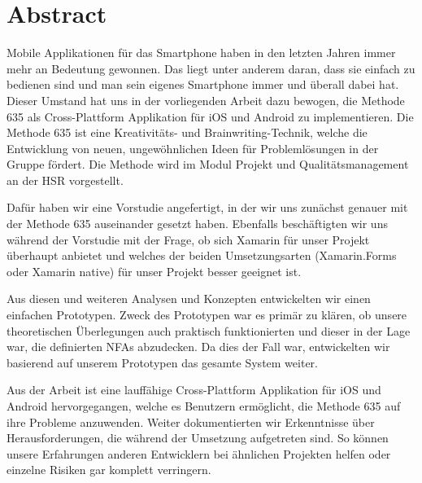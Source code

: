 \section*{Abstract}
Mobile Applikationen für das Smartphone haben in den letzten Jahren immer mehr an Bedeutung gewonnen. Das liegt unter anderem daran, dass sie einfach zu bedienen sind und man sein eigenes Smartphone immer und überall dabei hat. Dieser Umstand hat uns in der vorliegenden Arbeit dazu bewogen, die Methode 635 als Cross-Plattform Applikation für iOS und Android zu implementieren. Die Methode 635 ist eine Kreativitäts- und Brainwriting-Technik, welche die Entwicklung von neuen, ungewöhnlichen Ideen für Problemlösungen in der Gruppe fördert. Die Methode wird im Modul \grqq Projekt und Qualitätsmanagement\grqq{} an der HSR vorgestellt.

Dafür haben wir eine Vorstudie angefertigt, in der wir uns zunächst genauer mit der Methode 635 auseinander gesetzt haben. Ebenfalls beschäftigten wir uns während der Vorstudie mit der Frage, ob sich Xamarin für unser Projekt überhaupt anbietet und welches der beiden Umsetzungsarten (Xamarin.Forms oder Xamarin native) für unser Projekt besser geeignet ist.

Aus diesen und weiteren Analysen und Konzepten entwickelten wir einen einfachen Prototypen. Zweck des Prototypen war es primär zu klären, ob unsere theoretischen Überlegungen auch praktisch funktionierten und dieser in der Lage war, die definierten NFAs abzudecken. Da dies der Fall war, entwickelten wir basierend auf unserem Prototypen das gesamte System weiter.

Aus der Arbeit ist eine lauffähige Cross-Plattform Applikation für iOS und Android hervorgegangen, welche es Benutzern ermöglicht, die Methode 635 auf ihre Probleme anzuwenden. Weiter dokumentierten wir Erkenntnisse über Herausforderungen, die während der Umsetzung aufgetreten sind. So können unsere Erfahrungen anderen Entwicklern bei ähnlichen Projekten helfen oder einzelne Risiken gar komplett verringern. 